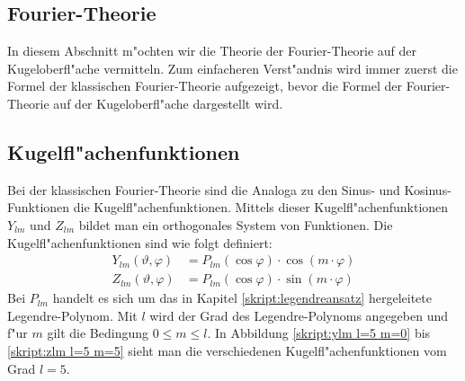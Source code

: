 \begin{refsection}
\section{Fourier-Theorie}
In diesem Abschnitt m"ochten wir die Theorie der Fourier-Theorie
auf der Kugeloberfl"ache vermitteln. 
Zum einfacheren Verst"andnis wird immer zuerst die Formel der 
klassischen Fourier-Theorie aufgezeigt, bevor die Formel der 
Fourier-Theorie auf der Kugeloberfl"ache dargestellt wird.

\subsection{Kugelfl"achenfunktionen}
%
Bei der klassischen Fourier-Theorie sind die Analoga zu den Sinus- 
und Kosinus-Funktionen die Kugelfl"achenfunktionen. 
Mittels dieser Kugelfl"achenfunktionen $Y_{lm}$ und $Z_{lm}$ 
bildet man ein orthogonales System von Funktionen. 
Die Kugelfl"achenfunktionen sind wie folgt definiert:
\begin{align*}
Y_{lm}(\vartheta, \varphi)& = P_{lm} (\cos \varphi) \cdot \cos(m \cdot \varphi)
\\
Z_{lm}(\vartheta, \varphi)& = P_{lm} (\cos \varphi) \cdot \sin(m \cdot \varphi)
\end{align*}
Bei $P_{lm}$ handelt es sich um das in Kapitel \ref{skript:legendreansatz} 
hergeleitete Legendre-Polynom. 
%
Mit $l$ wird der Grad des Legendre-Polynoms angegeben und f"ur $m$
gilt die Bedingung $0 \leq m \leq l$.  
In Abbildung \ref{skript:ylm l=5 m=0} bis \ref{skript:zlm l=5 m=5} sieht man die verschiedenen 
Kugelfl"achenfunktionen vom Grad $l = 5$.


\end{refsection}
